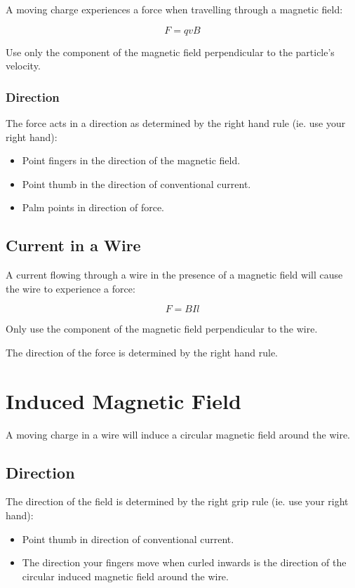 \documentclass[a4paper,11pt]{report}
\begin{document}
A moving charge experiences a force when travelling through a magnetic field:

$$
F = qvB
$$

Use only the component of the magnetic field perpendicular to the particle's
velocity.

\subsubsection{Direction}

The force acts in a direction as determined by the right hand rule (ie. use
your right hand):

\begin{itemize}
\item Point fingers in the direction of the magnetic field.
\item Point thumb in the direction of conventional current.
\item Palm points in direction of force.
\end{itemize}

\subsection{Current in a Wire}

A current flowing through a wire in the presence of a magnetic field will
cause the wire to experience a force:

$$
F = BIl
$$

Only use the component of the magnetic field perpendicular to the wire.

The direction of the force is determined by the right hand rule.


\section{Induced Magnetic Field}

A moving charge in a wire will induce a circular magnetic field around the
wire.

\subsection{Direction}

The direction of the field is determined by the right grip rule (ie. use your
right hand):

\begin{itemize}
\item Point thumb in direction of conventional current.
\item The direction your fingers move when curled inwards is the direction of
	the circular induced magnetic field around the wire.
\end{itemize}
\end{document}
